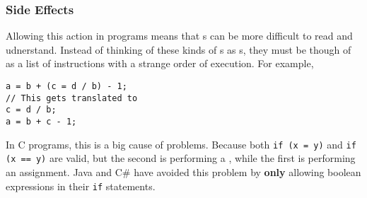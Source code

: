 \subsubsection{Side Effects}\label{subsubsec:Assignment_as_Expression-Side_Effects}
Allowing this action in programs means that s can be more difficult to read and udnerstand.
Instead of thinking of these kinds of s as s, they must be though of as a list of instructions with a strange order of execution.
For example,
\begin{verbatim}
a = b + (c = d / b) - 1;
// This gets translated to
c = d / b;
a = b + c - 1;
\end{verbatim}

In C programs, this is a big cause of problems.
Because both \texttt{if (x = y)} and \texttt{if (x == y)} are valid, but the second is performing a , while the first is performing an assignment.
Java and C\# have avoided this problem by \textbf{only} allowing boolean expressions in their \texttt{if} statements.

